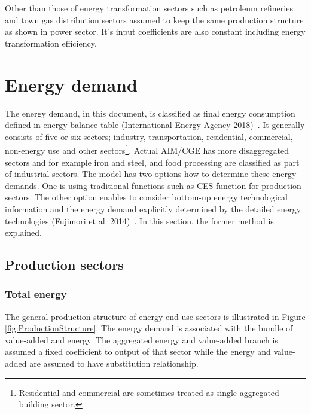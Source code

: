 \documentclass[10pt,a4paper,titlepage,dvipdfmx]{book}
\begin{document}
Other than those of energy transformation sectors such as petroleum refineries and town gas distribution sectors assumed to keep the same production structure as shown in power sector. It's input coefficients are also constant including energy transformation efficiency.

\section{\label{sec:EneDem}{Energy demand}}

The energy demand, in this document, is classified as final energy consumption defined in energy balance table (International Energy Agency 2018)~\cite{RN3606}. It generally consists of five or six sectors; industry, transportation, residential, commercial, non-energy use and other sectors\footnote{Residential and commercial are sometimes treated as single aggregated building sector.}. Actual AIM/CGE has more disaggregated sectors and for example iron and steel, and food processing are classified as part of industrial sectors. The model has two options how to determine these energy demands. One is using traditional functions such as CES function for production sectors. The other option enables to consider bottom-up energy technological information and the energy demand explicitly determined by the detailed energy technologies (Fujimori et al. 2014)~\cite{RN4010}. In this section, the former method is explained.

\subsection{\label{subsec:ProSec}{Production sectors}}

\subsubsection{\label{subsubsec:TotEne}Total energy}

The general production structure of energy end-use sectors is illustrated in Figure \ref{fig:ProductionStructure}. The energy demand is associated with the bundle of value-added and energy. The aggregated energy and value-added branch is assumed a fixed coefficient to output of that sector while the energy and value-added are assumed to have substitution relationship.
\end{document}
